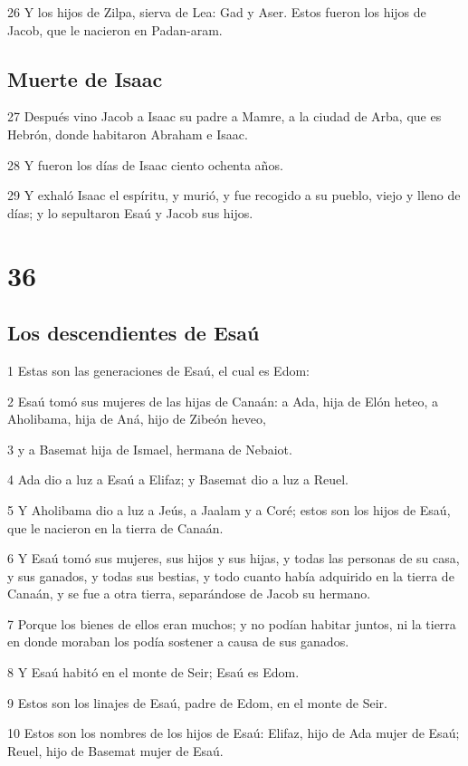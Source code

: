26 Y los hijos de Zilpa, sierva de Lea: Gad y Aser. Estos fueron los hijos de Jacob, que le nacieron en Padan-aram.

\section{Muerte de Isaac}

27 Después vino Jacob a Isaac su padre a Mamre, a la ciudad de Arba, que es Hebrón, donde habitaron Abraham e Isaac.

28 Y fueron los días de Isaac ciento ochenta años.

29 Y exhaló Isaac el espíritu, y murió, y fue recogido a su pueblo, viejo y lleno de días; y lo sepultaron Esaú y Jacob sus hijos.

\chapter{36}

\section{Los descendientes de Esaú}

1 Estas son las generaciones de Esaú, el cual es Edom:

2 Esaú tomó sus mujeres de las hijas de Canaán: a Ada, hija de Elón heteo, a Aholibama, hija de Aná, hijo de Zibeón heveo,

3 y a Basemat hija de Ismael, hermana de Nebaiot.

4 Ada dio a luz a Esaú a Elifaz; y Basemat dio a luz a Reuel.

5 Y Aholibama dio a luz a Jeús, a Jaalam y a Coré; estos son los hijos de Esaú, que le nacieron en la tierra de Canaán.

6 Y Esaú tomó sus mujeres, sus hijos y sus hijas, y todas las personas de su casa, y sus ganados, y todas sus bestias, y todo cuanto había adquirido en la tierra de Canaán, y se fue a otra tierra, separándose de Jacob su hermano.

7 Porque los bienes de ellos eran muchos; y no podían habitar juntos, ni la tierra en donde moraban los podía sostener a causa de sus ganados.

8 Y Esaú habitó en el monte de Seir; Esaú es Edom.

9 Estos son los linajes de Esaú, padre de Edom, en el monte de Seir.

10 Estos son los nombres de los hijos de Esaú: Elifaz, hijo de Ada mujer de Esaú; Reuel, hijo de Basemat mujer de Esaú.


